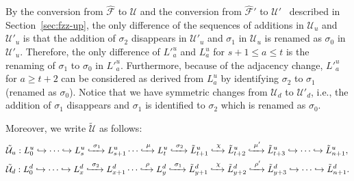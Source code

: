 \documentclass[letterpaper,11pt]{article}
\theoremstyle{mythmstyle}
\theoremstyle{mydefstyle}
\theoremstyle{plain}
\theoremstyle{definition}
\newcommand{\<}[1]{\langle #1\rangle}
\newcommand{\lbarrowspace}{\;}
\newcommand{\incto}{\hookrightarrow}
\newcommand{\inctosp}[1]{\xhookrightarrow{\lbarrowspace#1\lbarrowspace}}
\newcommand{\Fcal}{\mathcal{F}}
\newcommand{\Ucal}{\mathcal{U}}
\newcommand{\sG}{\sigma}
\newcommand{\simpcnt}{n}
\newcommand{\extsimp}{\chi}
\begin{document}
By the conversion from $\hat{\Fcal}$ to $\Ucal$ and the conversion from $\hat{\Fcal}'$ to $\Ucal'$~\cite{dey2022fast}
described in Section~\ref{sec:fzz-up},
the only difference of the sequences of additions in  $\Ucal_u$ and $\Ucal'_u$
is that 
the addition of ${\sG_2}$ 
disappears in  $\Ucal'_u$
and $\sG_1$ in $\Ucal_u$ is renamed as $\sG_0$ in $\Ucal'_u$.
Therefore, the only difference of $L'^u_a$ and $L^u_a$ for $s+1\leq a\leq t$
is the renaming of $\sG_1$ to $\sG_0$ in $L'^u_a$.
Furthermore,
because of the adjacency change,
$L'^u_a$ for $a\geq t+2$ can be considered as derived from
$L^u_a$ by identifying $\sG_2$ to $\sG_1$ (renamed as $\sG_0$).
Notice that we have symmetric changes from $\Ucal_d$ to $\Ucal'_d$,
i.e., the addition of
${\sG_1}$ 
disappears and
$\sG_1$ is identified to $\sG_2$ which is renamed as $\sG_0$.

Moreover, we write $\tilde{\Ucal}$  as follows:
\begin{align*}
&\tilde{\Ucal}_u:L^u_0\incto
\cdots
\incto
L^u_s\inctosp{\sG_1}
L^u_{s+1}
\cdots
\inctosp{\mu}
L^u_t\inctosp{\sG_2}
\tilde{L}^u_{t+1}\inctosp{\extsimp}
\tilde{L}^u_{t+2}
\inctosp{\mu'}
\tilde{L}^u_{t+3}
\incto\cdots
\incto
\tilde{L}^u_{\simpcnt+1},\\
&\tilde{\Ucal}_d:L^d_0\incto
\cdots\incto
L^d_x\inctosp{\sG_2}
L^d_{x+1}
\cdots
\inctosp{\rho}
L^d_y\inctosp{\sG_1}
\tilde{L}^d_{y+1}\inctosp{\extsimp}
\tilde{L}^d_{y+2}
\inctosp{\rho'}
\tilde{L}^d_{y+3}
\incto
\cdots\incto
\tilde{L}^d_{\simpcnt+1}.
\end{align*}
\end{document}
